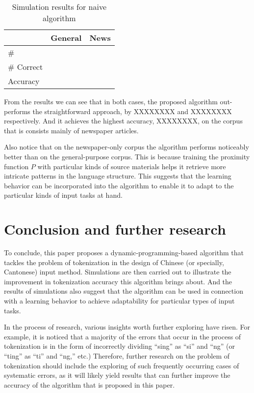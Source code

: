 \documentclass[a4paper,11pt,twocolumn]{article}
\begin{document}
\begin{table}[h]
\centering
\begin{tabular}{@{}lll@{}}
\toprule
           & General & News \\ \midrule
\#         &         &      \\
\# Correct &         &      \\
Accuracy   &         &      \\ \bottomrule
\end{tabular}
\caption{Simulation results for naive algorithm}
\label{table:naive}
\end{table}

From the results we can see that in both cases, the proposed algorithm out-performs the straightforward approach, by XXXXXXXX and XXXXXXXX respectively. And it achieves the highest accuracy, XXXXXXXX, on the corpus that is consists mainly of newspaper articles.

Also notice that on the newspaper-only corpus the algorithm performs noticeably better than on the general-purpose corpus. This is because training the proximity function $P$ with particular kinds of source materials helps it retrieve more intricate patterns in the language structure. This suggests that the learning behavior can be incorporated into the algorithm to enable it to adapt to the particular kinds of input tasks at hand.

\section{Conclusion and further research}

To conclude, this paper proposes a dynamic-programming-based algorithm that tackles the problem of tokenization in the design of Chinese (or specially, Cantonese) input method. Simulations are then carried out to illustrate the improvement in tokenization accuracy this algorithm brings about. And the results of simulations also suggest that the algorithm can be used in connection with a learning behavior to achieve adaptability for particular types of input tasks.

In the process of research, various insights worth further exploring have risen. For example, it is noticed that a majority of the errors that occur in the process of tokenization is in the form of incorrectly dividing ``sing'' as ``si'' and ``ng'' (or ``ting'' as ``ti'' and ``ng,'' etc.) Therefore, further research on the problem of tokenization should include the exploring of such frequently occurring cases of systematic errors, as it will likely yield results that can further improve the accuracy of the algorithm that is proposed in this paper.



\end{document}
